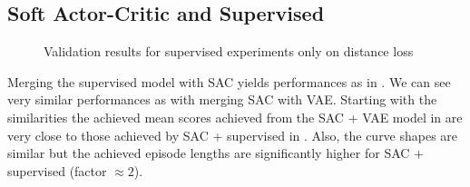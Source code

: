 \subsection{Soft Actor-Critic and Supervised}

\begin{figure}[h]
    \begin{center}
        \hfill
    \end{center}
    \caption[SAC + Supervised Distance Loss]{Validation results for supervised experiments only on distance loss}
    \label{fig:sac_supervised}
\end{figure}

Merging the supervised model with SAC yields performances as in . We can see very similar performances as with merging SAC with VAE. Starting with the similarities the achieved mean scores achieved from the SAC + VAE model in  are very close to those achieved by SAC + supervised in . Also, the curve shapes are similar but the achieved episode lengths are significantly higher for SAC + supervised (factor $\approx 2$).


